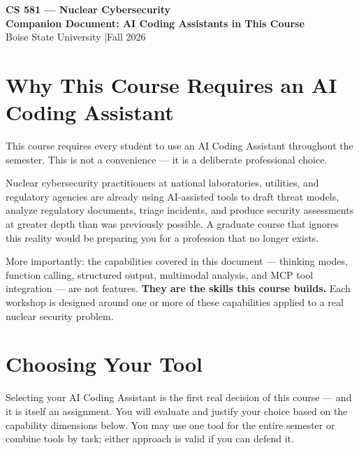\documentclass[9pt]{extarticle}
\begin{document}
\begin{center}
    {\large\textbf{CS 581 --- Nuclear Cybersecurity}} \\[2pt]
    {\normalsize\textbf{Companion Document: AI Coding Assistants in This Course}} \\[1pt]
    {\normalsize Boise State University \quad|\quad Fall 2026}
\end{center}
\vspace{4pt}

\section*{Why This Course Requires an AI Coding Assistant}

This course requires every student to use an AI Coding Assistant throughout the
semester. This is not a convenience --- it is a deliberate professional choice.

Nuclear cybersecurity practitioners at national laboratories, utilities, and
regulatory agencies are already using AI-assisted tools to draft threat models,
analyze regulatory documents, triage incidents, and produce security assessments
at greater depth than was previously possible. A graduate course that ignores
this reality would be preparing you for a profession that no longer exists.

More importantly: the capabilities covered in this document --- thinking modes,
function calling, structured output, multimodal analysis, and MCP tool
integration --- are not features. \textbf{They are the skills this course builds.}
Each workshop is designed around one or more of these capabilities applied to a
real nuclear security problem.

\section*{Choosing Your Tool}

Selecting your AI Coding Assistant is the first real decision of this course ---
and it is itself an assignment. You will evaluate and justify your choice based
on the capability dimensions below. You may use one tool for the entire semester
or combine tools by task; either approach is valid if you can defend it.
\end{document}
